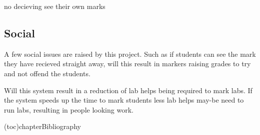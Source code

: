 \documentclass[12pt]{article}  %
\theoremstyle{definition}
\theoremstyle{remark}
\begin{document}
no decieving see their own marks

\subsection{Social}

A few social issues are raised by this project. Such as if students can see the mark they have recieved straight away, will this result in markers raising grades to try and not offend the students.

Will this system result in a reduction of lab helps being required to mark labs. If the system speeds up the time to mark students less lab helps may-be need to run labs, resulting in people looking work.



%
%

\newpage


\addcontentsline(toc){chapter}{Bibliography}

\end{document}
